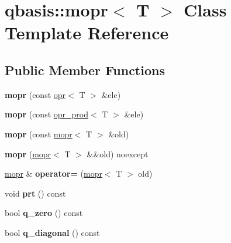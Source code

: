 \hypertarget{classqbasis_1_1mopr}{}\section{qbasis\+:\+:mopr$<$ T $>$ Class Template Reference}
\label{classqbasis_1_1mopr}
\subsection*{Public Member Functions}
\begin{DoxyCompactItemize}
\item 
\mbox{\label{classqbasis_1_1mopr_a76eda5b2cf70efb41bba53e74099e97a}} 
{\bfseries mopr} (const \hyperlink{classqbasis_1_1opr}{opr}$<$ T $>$ \&ele)
\item 
\mbox{\label{classqbasis_1_1mopr_a6a35a0794db207606cc0ef95e704cc17}} 
{\bfseries mopr} (const \hyperlink{classqbasis_1_1opr__prod}{opr\+\_\+prod}$<$ T $>$ \&ele)
\item 
\mbox{\label{classqbasis_1_1mopr_af50f570e1ca0aa3fb67b853fad81c2d5}} 
{\bfseries mopr} (const \hyperlink{classqbasis_1_1mopr}{mopr}$<$ T $>$ \&old)
\item 
\mbox{\label{classqbasis_1_1mopr_aec9399b33aa59c20c377d4fdc675b68d}} 
{\bfseries mopr} (\hyperlink{classqbasis_1_1mopr}{mopr}$<$ T $>$ \&\&old) noexcept
\item 
\mbox{\label{classqbasis_1_1mopr_a748af7ba6d68732511a5e5827c838991}} 
\hyperlink{classqbasis_1_1mopr}{mopr} \& {\bfseries operator=} (\hyperlink{classqbasis_1_1mopr}{mopr}$<$ T $>$ old)
\item 
\mbox{\label{classqbasis_1_1mopr_a1df0c5aa72aa991b783db443522ee0be}} 
void {\bfseries prt} () const
\item 
\mbox{\label{classqbasis_1_1mopr_abd369f81a580fbae55d8118ae2063ecf}} 
bool {\bfseries q\+\_\+zero} () const
\item 
\mbox{\label{classqbasis_1_1mopr_aa728b865cc2b8316acc93ee040e3ef5b}} 
bool {\bfseries q\+\_\+diagonal} () const

\end{DoxyCompactItemize}

